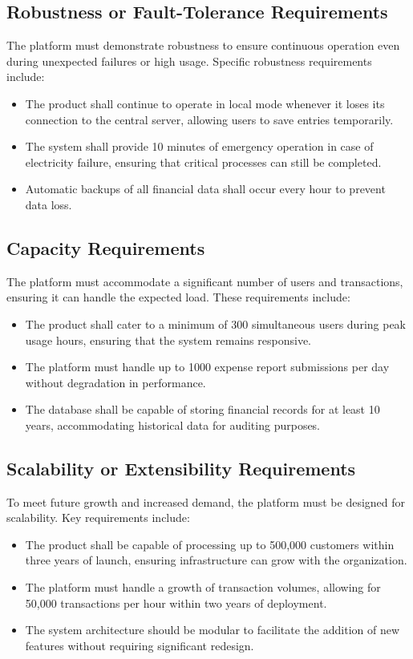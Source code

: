 \documentclass[12pt]{article}
\begin{document}
\subsection{Robustness or Fault-Tolerance Requirements}
The platform must demonstrate robustness to ensure continuous operation even during unexpected failures or high usage. Specific robustness requirements include:

\begin{itemize}
    \item The product shall continue to operate in local mode whenever it loses its connection to the central server, allowing users to save entries temporarily.
    \item The system shall provide 10 minutes of emergency operation in case of electricity failure, ensuring that critical processes can still be completed.
    \item Automatic backups of all financial data shall occur every hour to prevent data loss.
\end{itemize}

\subsection{Capacity Requirements}
The platform must accommodate a significant number of users and transactions, ensuring it can handle the expected load. These requirements include:

\begin{itemize}
    \item The product shall cater to a minimum of 300 simultaneous users during peak usage hours, ensuring that the system remains responsive.
    \item The platform must handle up to 1000 expense report submissions per day without degradation in performance.
    \item The database shall be capable of storing financial records for at least 10 years, accommodating historical data for auditing purposes.
\end{itemize}

\subsection{Scalability or Extensibility Requirements}
To meet future growth and increased demand, the platform must be designed for scalability. Key requirements include:

\begin{itemize}
    \item The product shall be capable of processing up to 500,000 customers within three years of launch, ensuring infrastructure can grow with the organization.
    \item The platform must handle a growth of transaction volumes, allowing for 50,000 transactions per hour within two years of deployment.
    \item The system architecture should be modular to facilitate the addition of new features without requiring significant redesign.
\end{itemize}
\end{document}

